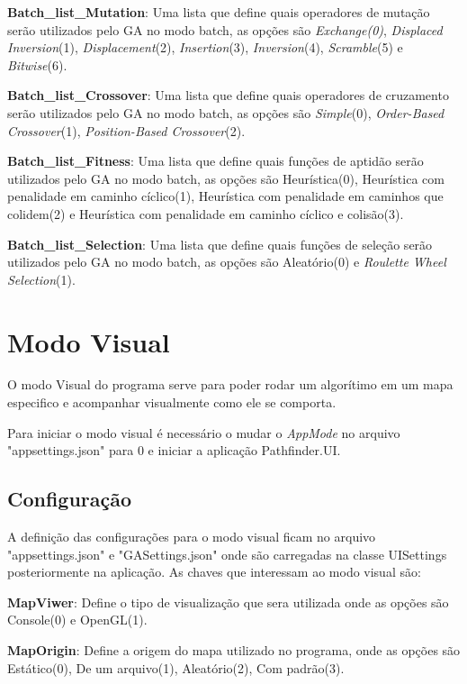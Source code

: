  \textbf{Batch\_list\_Mutation}: Uma lista que define quais operadores de mutação serão utilizados pelo GA no modo batch, as opções são  \textit{Exchange(0)}, \textit{Displaced Inversion}(1), \textit{Displacement}(2), \textit{Insertion}(3), \textit{Inversion}(4), \textit{Scramble}(5) e \textit{Bitwise}(6).
 
 \textbf{Batch\_list\_Crossover}: Uma lista que define quais operadores de cruzamento serão utilizados pelo GA no modo batch, as opções são  \textit{Simple}(0), \textit{Order-Based Crossover}(1), \textit{Position-Based Crossover}(2).
 
 \textbf{Batch\_list\_Fitness}: Uma lista que define quais funções de aptidão serão utilizados pelo GA no modo batch, as opções são Heurística(0), Heurística com penalidade em caminho cíclico(1), Heurística com penalidade em caminhos que colidem(2) e Heurística com penalidade em caminho cíclico e colisão(3).
 
 \textbf{Batch\_list\_Selection}: Uma lista que define quais funções de seleção serão utilizados pelo GA no modo batch, as opções são  Aleatório(0) e \textit{Roulette Wheel Selection}(1).
 
 \section{Modo Visual}
 
 O modo Visual do programa serve para poder rodar um algorítimo em um mapa especifico e acompanhar visualmente como ele se comporta.
 
 Para iniciar o modo visual é necessário o mudar o \textit{AppMode} no arquivo "appsettings.json" para 0 e iniciar a aplicação Pathfinder.UI.
 
 
 \subsection{Configuração}
 
 
 A definição das configurações para o modo visual ficam no arquivo "appsettings.json" e "GASettings.json" onde são carregadas na classe UISettings posteriormente na aplicação. As chaves que interessam ao modo visual são:
 
 
 \textbf{MapViwer}: Define o tipo de visualização que sera utilizada onde as opções são Console(0) e OpenGL(1).
 
 \textbf{MapOrigin}: Define a origem do mapa utilizado no programa, onde as opções são Estático(0), De um arquivo(1), Aleatório(2), Com padrão(3).
 
